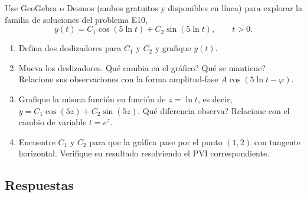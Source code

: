 \begin{activity}
    Use GeoGebra o Desmos (ambos gratuitos y disponibles en l\'inea) para explorar la familia de soluciones del problema E10,
    \[
    y(t)=C_1\cos(5\ln t)+C_2\sin(5\ln t),\qquad t>0.
    \]
    \begin{enumerate}[label=\alph*)]
        \item Defina dos deslizadores para $C_1$ y $C_2$ y grafique $y(t)$.
        \item Mueva los deslizadores. \textquestiondown Qu\'e cambia en el gr\'afico? \textquestiondown Qu\'e se mantiene? Relacione sus observaciones con la forma amplitud-fase $A\cos(5\ln t-\varphi)$.
        \item Grafique la misma funci\'on en funci\'on de $z=\ln t$, es decir, $y=C_1\cos(5z)+C_2\sin(5z)$. \textquestiondown Qu\'e diferencia observa? Relacione con el cambio de variable $t=e^z$.
        \item Encuentre $C_1$ y $C_2$ para que la gr\'afica pase por el punto $(1,2)$ con tangente horizontal. Verifique su resultado resolviendo el PVI correspondiente.
    \end{enumerate}
\end{activity}

\newpage
\subsection*{Respuestas}

